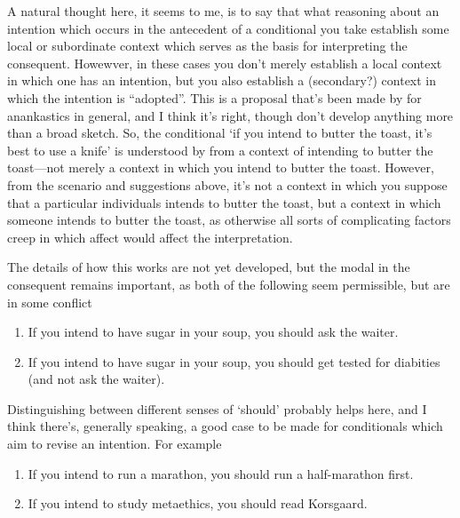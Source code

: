 \documentclass[10pt]{article}
\begin{document}
A natural thought here, it seems to me, is to say that what reasoning about an intention which occurs in the antecedent of a conditional you take establish some local or subordinate context which serves as the basis for interpreting the consequent.
Howewver, in these cases you don't merely establish a local context in which one has an intention, but you also establish a (secondary?) context in which the intention is ``adopted''.
This is a proposal that's been made by \textcite{Dunaway:2014aa} for anankastics in general, and I think it's right, though \citeauthor{Dunaway:2014aa} don't develop anything more than a broad sketch.
So, the conditional `if you intend to butter the toast, it's best to use a knife' is understood by from a context of intending to butter the toast---not merely a context in which you intend to butter the toast.
However, from the scenario and suggestions above, it's not a context in which you suppose that a particular individuals intends to butter the toast, but a context in which someone intends to butter the toast, as otherwise all sorts of complicating factors creep in which affect would affect the interpretation.

The details of how this works are not yet developed, but the modal in the consequent remains important, as both of the following seem permissible, but are in some conflict
\begin{enumerate}
\item If you intend to have sugar in your soup, you should ask the waiter.
\item If you intend to have sugar in your soup, you should get tested for diabities (and not ask the waiter).
\end{enumerate}

Distinguishing between different senses of `should' probably helps here, and I think there's, generally speaking, a good case to be made for conditionals which aim to revise an intention.
For example
\begin{enumerate}
\item If you intend to run a marathon, you should run a half-marathon first.
\item If you intend to study metaethics, you should read Korsgaard.
\end{enumerate}
\end{document}
